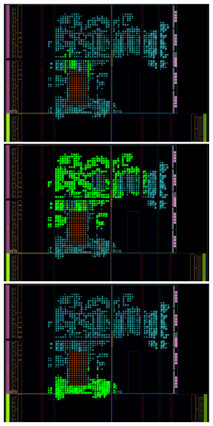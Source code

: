 \begin{figure}[H]
   \begin{minipage}[b]{0.5\linewidth} 
        \centering
        \includegraphics[width=\linewidth]{images/tero_block_area_usage.png}
   \end{minipage}\hfill
   \begin{minipage}[b]{0.5\linewidth}   
        \centering
        \includegraphics[width=\linewidth]{images/control_and_interface_area_usage.png}
   \end{minipage}
   \begin{minipage}[b]{0.5\linewidth} 
        \centering
        \includegraphics[width=\linewidth]{images/decoder_area_usage.png}

\end{minipage}
\end{figure}
